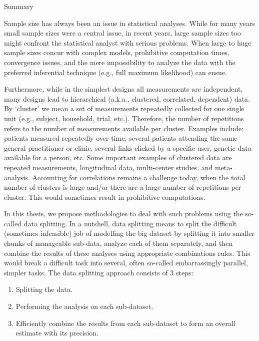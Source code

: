 \documentclass[14pt]{article}
\begin{document}
\begin{center}
{\Huge{Summary}}
\end{center}
\vspace{1cm}
Sample size has always been an issue in statistical analyses. While for many years small sample sizes were a central issue, in recent years, large sample sizes too might confront the statistical analyst with serious problems. When large to huge sample sizes concur with complex models, prohibitive computation times, convergence issues, and the mere impossibility to analyze the data with the preferred inferential technique (e.g., full maximum likelihood) can ensue. 

Furthermore, while in the simplest designs all measurements are independent, many designs lead to hierarchical (a.k.a., clustered, correlated, dependent) data. By `cluster' we mean a set of measurements repeatedly collected for one single unit (e.g., subject, household, trial, etc.). Therefore, the number of repetitions refers to the number of measurements available per cluster. Examples include: patients measured repeatedly over time, several patients attending the same general practitioner or clinic, several links clicked by a specific user, genetic data available for a person, etc. Some important examples of clustered data are repeated measurements, longitudinal data, multi-center studies, and meta-analysis. Accounting for correlations remains a challenge today, when the total number of clusters is large and/or there are a large number of repetitions per cluster. This would sometimes result in prohibitive computations. 

In this thesis, we propose methodologies to deal with such problems using the so-called data splitting. In a nutshell, data splitting means to split the difficult (sometimes infeasible) job of modelling the big dataset by splitting it into smaller chunks of manageable sub-data, analyze each of them separately, and then combine the results of these analyses using appropriate combinations rules. This would break a difficult task into several, often so-called embarrassingly parallel, simpler tasks. The data splitting approach consists of 3 steps:
\begin{enumerate}
\item Splitting the data.
\item Performing the analysis on each sub-dataset.
\item Efficiently combine the results from each sub-dataset to form an overall estimate with its precision.
\end{enumerate}
\end{document}
